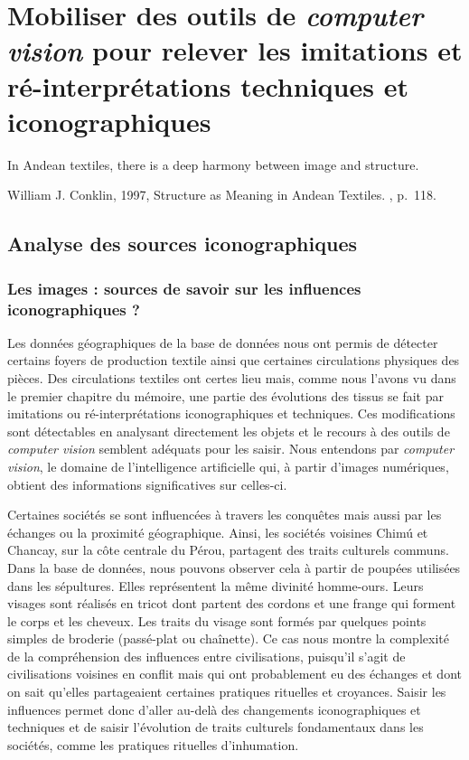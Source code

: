 \chapter{Mobiliser des outils de \textit{computer vision} pour relever les imitations et ré-interprétations techniques et iconographiques}
\markboth{}{}

\epigraph{\og In Andean textiles, there is a deep harmony between image and structure.\fg}{William J. Conklin, 1997, \og Structure as Meaning in Andean Textiles. \fg, p.~118.}


\section{Analyse des sources iconographiques}
\subsection{Les images : sources de savoir sur les influences iconographiques ?}

Les données géographiques de la base de données nous ont permis de détecter certains foyers de production textile ainsi que certaines circulations physiques des pièces.  Des circulations textiles ont certes lieu mais, comme nous l'avons vu dans le premier chapitre du mémoire, une partie des évolutions des tissus se fait par imitations ou ré-interprétations iconographiques et techniques. Ces modifications sont détectables en analysant directement les objets et le recours à des outils de \textit{computer vision} semblent adéquats pour les saisir. Nous entendons par \textit{computer vision}, le domaine de l'intelligence artificielle qui, à partir d'images numériques, obtient des informations significatives sur celles-ci.

Certaines sociétés se sont influencées à travers les conquêtes mais aussi par les échanges ou la proximité géographique. 
Ainsi, les sociétés voisines Chimú et Chancay, sur la côte centrale du Pérou, partagent des traits culturels communs. Dans la base de données, nous pouvons observer cela à partir de poupées utilisées dans les sépultures. Elles représentent la même divinité homme-ours. Leurs visages sont réalisés en tricot dont partent des cordons et une frange qui forment le corps et les cheveux. Les traits du visage sont formés par quelques points simples de broderie (passé-plat ou chaînette). Ce cas nous montre la complexité de la compréhension des influences entre civilisations, puisqu'il s'agit de civilisations voisines en conflit mais qui ont probablement eu des échanges et dont on sait qu'elles partageaient certaines pratiques rituelles et croyances. Saisir les influences permet donc d'aller au-delà des changements iconographiques et techniques et de saisir l'évolution de traits culturels fondamentaux dans les sociétés, comme les pratiques rituelles d'inhumation. 


